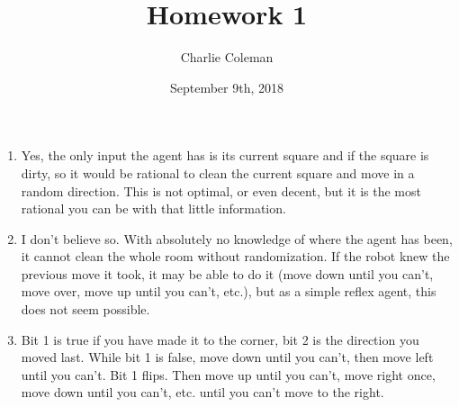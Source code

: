\documentclass{article}
\title{Homework 1}
\author{Charlie Coleman}
\date{September 9th, 2018}
\begin{document}
	
	\maketitle
	
	\begin{enumerate}
		\item Yes, the only input the agent has is its current square and if the square is dirty, so it would be rational to clean the current square and move in a random direction. This is not optimal, or even decent, but it is the most rational you can be with that little information.
		\item I don't believe so. With absolutely no knowledge of where the agent has been, it cannot clean the whole room without randomization. If the robot knew the previous move it took, it may be able to do it (move down until you can't, move over, move up until you can't, etc.), but as a simple reflex agent, this does not seem possible.
		\item Bit 1 is true if you have made it to the corner, bit 2 is the direction you moved last. While bit 1 is false, move down until you can't, then move left until you can't. Bit 1 flips. Then move up until you can't, move right once, move down until you can't, etc. until you can't move to the right.
	\end{enumerate}
	
\end{document}
